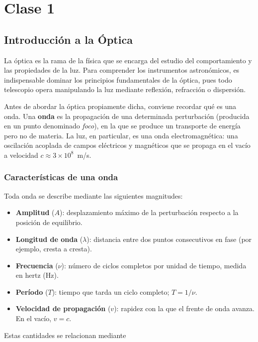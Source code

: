 \chapter{Clase 1}

\section{Introducción a la Óptica}

La óptica es la rama de la física que se encarga del estudio del comportamiento y las propiedades de la luz. Para comprender los instrumentos astronómicos, es indispensable dominar los principios fundamentales de la óptica, pues todo telescopio opera manipulando la luz mediante reflexión, refracción o dispersión.

Antes de abordar la óptica propiamente dicha, conviene recordar qué es una onda. Una \textbf{onda} es la propagación de una determinada perturbación (producida en un punto denominado \textit{foco}), en la que se produce un transporte de energía pero no de materia. La luz, en particular, es una onda electromagnética: una oscilación acoplada de campos eléctricos y magnéticos que se propaga en el vacío a velocidad $c \approx 3\times10^{8}$~m/s.

\subsection{Características de una onda}

Toda onda se describe mediante las siguientes magnitudes:

\begin{itemize}
    \item \textbf{Amplitud} ($A$): desplazamiento máximo de la perturbación respecto a la posición de equilibrio.
    \item \textbf{Longitud de onda} ($\lambda$): distancia entre dos puntos consecutivos en fase (por ejemplo, cresta a cresta).
    \item \textbf{Frecuencia} ($\nu$): número de ciclos completos por unidad de tiempo, medida en hertz (Hz).
    \item \textbf{Período} ($T$): tiempo que tarda un ciclo completo; $T=1/\nu$.
    \item \textbf{Velocidad de propagación} ($v$): rapidez con la que el frente de onda avanza. En el vacío, $v=c$.
\end{itemize}

Estas cantidades se relacionan mediante

